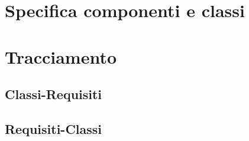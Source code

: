 \documentclass[a4paper, titlepage]{article}
\begin{document}
\section{Specifica componenti e classi}



\section{Tracciamento}

\subsection{Classi-Requisiti}


\subsection{Requisiti-Classi}

\end{document}
